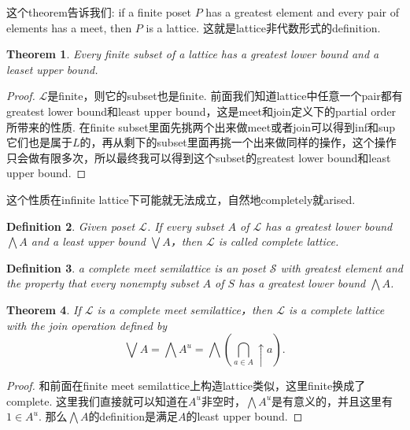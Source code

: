 \documentclass{article}
\newtheorem{theorem}{Theorem}[section]
\newtheorem{definition}[theorem]{Definition}
\newcommand\slattice{\mathcal{S}}
\newcommand\lattice{\mathcal{L}}
\begin{document}
这个theorem告诉我们: {\color{red} if a finite poset $P$ has a greatest element and every pair of elements has a meet,
then $P$ is a lattice}. 这就是lattice非代数形式的definition.

\begin{theorem}
\rm Every finite subset of a lattice has a greatest lower bound and a leaset upper bound.
\end{theorem}

\begin{proof}
$\lattice$是finite，则它的subset也是finite. 前面我们知道lattice中任意一个pair都有greatest lower bound和least upper bound，这是meet和join定义下的partial order所带来的性质. 在finite subset里面先挑两个出来做meet或者join可以得到inf和sup它们也是属于$L$的，再从剩下的subset里面再挑一个出来做同样的操作，这个操作只会做有限多次，所以最终我可以得到这个subset的greatest lower bound和least upper bound.
\end{proof}

{\color{red} 这个性质在infinite lattice下可能就无法成立，自然地completely就arised}.

\begin{definition}
\rm Given poset $\lattice$. If every subset $A$ of $\lattice$ has a greatest lower bound $\bigwedge A$ and a least upper bound $\bigvee A$，then $\lattice$ is called {\color{red} complete lattice}. 
\end{definition}


\begin{definition}
\rm a {\color{red} complete meet semilattice} is an poset $\slattice$ with greatest element and the property that every nonempty subset $A$ of $S$ has a greatest lower bound $\bigwedge A$.
\end{definition}


\begin{theorem}
\rm If $\lattice$ is a complete meet semilattice，then $\lattice$ is a complete lattice with the join operation defined by
$$
\bigvee A = \bigwedge A^u = \bigwedge (\bigcap\limits_{a \in A} \uparrow a).
$$
\end{theorem}

\begin{proof}
和前面在finite meet semilattice上构造lattice类似，这里finite换成了complete. 这里我们直接就可以知道在$A^u$非空时，$\bigwedge A^u$是有意义的，并且这里有$1 \in A^u$. 那么$\bigwedge A$的definition是满足$A$的least upper bound.
\end{proof}
\end{document}
